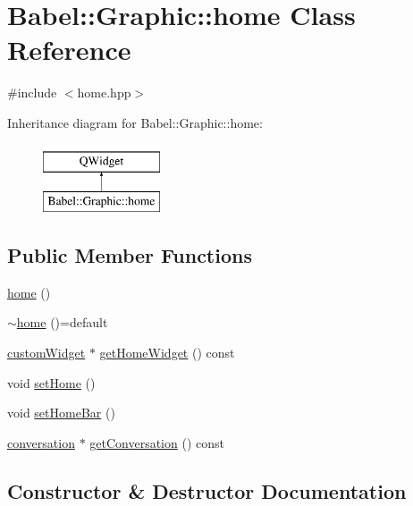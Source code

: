 \hypertarget{classBabel_1_1Graphic_1_1home}{}\section{Babel\+:\+:Graphic\+:\+:home Class Reference}
\label{classBabel_1_1Graphic_1_1home}


{\ttfamily \#include $<$home.\+hpp$>$}

Inheritance diagram for Babel\+:\+:Graphic\+:\+:home\+:\begin{figure}[H]
\begin{center}
\leavevmode
\includegraphics[height=2.000000cm]{classBabel_1_1Graphic_1_1home}
\end{center}
\end{figure}
\subsection*{Public Member Functions}
\begin{DoxyCompactItemize}
\item 
\hyperlink{classBabel_1_1Graphic_1_1home_a29d5bcb0aec2d7b6bb2b524712be7735}{home} ()
\item 
\hyperlink{classBabel_1_1Graphic_1_1home_a31a5fda4e1faf1ad427c339aba1581da}{$\sim$home} ()=default
\item 
\hyperlink{classBabel_1_1Graphic_1_1customWidget}{custom\+Widget} $\ast$ \hyperlink{classBabel_1_1Graphic_1_1home_a2c22835d143b5137919c9dd9fb32e653}{get\+Home\+Widget} () const
\item 
void \hyperlink{classBabel_1_1Graphic_1_1home_ac64978cf021005f93a8050929d2151b5}{set\+Home} ()
\item 
void \hyperlink{classBabel_1_1Graphic_1_1home_ac6ea1576dd3ad65a4ec6eccc6b943287}{set\+Home\+Bar} ()
\item 
\hyperlink{classBabel_1_1Graphic_1_1conversation}{conversation} $\ast$ \hyperlink{classBabel_1_1Graphic_1_1home_a62bd864607f2891746e4ec80f4ae4df6}{get\+Conversation} () const
\end{DoxyCompactItemize}


\subsection{Constructor \& Destructor Documentation}
\mbox{\label{classBabel_1_1Graphic_1_1home_a29d5bcb0aec2d7b6bb2b524712be7735}} 
